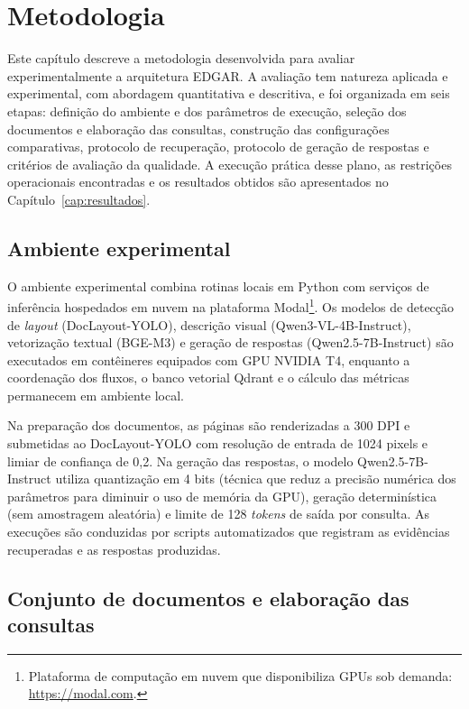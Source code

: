 \chapter{Metodologia}
\label{chap:metodologia-avaliacao}

Este capítulo descreve a metodologia desenvolvida para avaliar experimentalmente a arquitetura EDGAR. A avaliação tem natureza aplicada e experimental, com abordagem quantitativa e descritiva, e foi organizada em seis etapas: definição do ambiente e dos parâmetros de execução, seleção dos documentos e elaboração das consultas, construção das configurações comparativas, protocolo de recuperação, protocolo de geração de respostas e critérios de avaliação da qualidade. A execução prática desse plano, as restrições operacionais encontradas e os resultados obtidos são apresentados no Capítulo~\ref{cap:resultados}.

\section{Ambiente experimental}
\label{sec:ambiente_execucao}

O ambiente experimental combina rotinas locais em Python com serviços de inferência hospedados em nuvem na plataforma Modal\footnote{Plataforma de computação em nuvem que disponibiliza GPUs sob demanda: \url{https://modal.com}.}. Os modelos de detecção de \textit{layout} (DocLayout-YOLO), descrição visual (Qwen3-VL-4B-Instruct), vetorização textual (BGE-M3) e geração de respostas (Qwen2.5-7B-Instruct) são executados em contêineres equipados com GPU NVIDIA T4, enquanto a coordenação dos fluxos, o banco vetorial Qdrant e o cálculo das métricas permanecem em ambiente local.

Na preparação dos documentos, as páginas são renderizadas a 300 DPI e submetidas ao DocLayout-YOLO com resolução de entrada de 1024 pixels e limiar de confiança de 0,2. Na geração das respostas, o modelo Qwen2.5-7B-Instruct utiliza quantização em 4 bits (técnica que reduz a precisão numérica dos parâmetros para diminuir o uso de memória da GPU), geração determinística (sem amostragem aleatória) e limite de 128 \textit{tokens} de saída por consulta. As execuções são conduzidas por scripts automatizados que registram as evidências recuperadas e as respostas produzidas.

\section{Conjunto de documentos e elaboração das consultas}
\label{sec:conjunto_documentos_perguntas}

